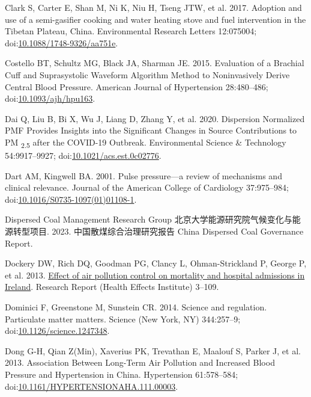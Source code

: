 \documentclass[
  letterpaper,
  DIV=11,
  numbers=noendperiod]{scrartcl}
\newlength{\cslhangindent}
\newlength{\cslentryspacingunit} %
\newenvironment{CSLReferences}[2] %
 {%
  \setlength{\parindent}{0pt}
  \ifodd #1
  \let\oldpar\par
  \def\par{\hangindent=\cslhangindent\oldpar}
  \fi
  \setlength{\parskip}{#2\cslentryspacingunit}
 }%
 {}
\begin{document}
\begin{CSLReferences}{1}{0}
\leavevmode{}%
Clark S, Carter E, Shan M, Ni K, Niu H, Tseng JTW, et al. 2017. Adoption
and use of a semi-gasifier cooking and water heating stove and fuel
intervention in the {Tibetan Plateau}, {China}. Environmental Research
Letters 12:075004;
doi:\href{https://doi.org/10.1088/1748-9326/aa751e}{10.1088/1748-9326/aa751e}.

\leavevmode{}%
Costello BT, Schultz MG, Black JA, Sharman JE. 2015. Evaluation of a
{Brachial Cuff} and {Suprasystolic Waveform Algorithm Method} to
{Noninvasively Derive Central Blood Pressure}. American Journal of
Hypertension 28:480--486;
doi:\href{https://doi.org/10.1093/ajh/hpu163}{10.1093/ajh/hpu163}.

\leavevmode{}%
Dai Q, Liu B, Bi X, Wu J, Liang D, Zhang Y, et al. 2020. Dispersion
{Normalized PMF Provides Insights} into the {Significant Changes} in
{Source Contributions} to {PM} {\textsubscript{2.5}} after the {COVID-19
Outbreak}. Environmental Science \& Technology 54:9917--9927;
doi:\href{https://doi.org/10.1021/acs.est.0c02776}{10.1021/acs.est.0c02776}.

\leavevmode{}%
Dart AM, Kingwell BA. 2001. Pulse pressure---a review of mechanisms and
clinical relevance. Journal of the American College of Cardiology
37:975--984;
doi:\href{https://doi.org/10.1016/S0735-1097(01)01108-1}{10.1016/S0735-1097(01)01108-1}.

\leavevmode{}%
Dispersed Coal Management Research Group
北京大学能源研究院气候变化与能源转型项目. 2023. 中国散煤综合治理研究报告
{China Dispersed Coal Governance Report}.

\leavevmode{}%
Dockery DW, Rich DQ, Goodman PG, Clancy L, Ohman-Strickland P, George P,
et al. 2013. \href{https://www.ncbi.nlm.nih.gov/pubmed/24024358}{Effect
of air pollution control on mortality and hospital admissions in
{Ireland}}. Research Report (Health Effects Institute) 3--109.

\leavevmode{}%
Dominici F, Greenstone M, Sunstein CR. 2014. Science and regulation.
{Particulate} matter matters. Science (New York, NY) 344:257--9;
doi:\href{https://doi.org/10.1126/science.1247348}{10.1126/science.1247348}.

\leavevmode{}%
Dong G-H, Qian Z(Min), Xaverius PK, Trevathan E, Maalouf S, Parker J, et
al. 2013. Association {Between Long-Term Air Pollution} and {Increased
Blood Pressure} and {Hypertension} in {China}. Hypertension 61:578--584;
doi:\href{https://doi.org/10.1161/HYPERTENSIONAHA.111.00003}{10.1161/HYPERTENSIONAHA.111.00003}.


\end{CSLReferences}
\end{document}
